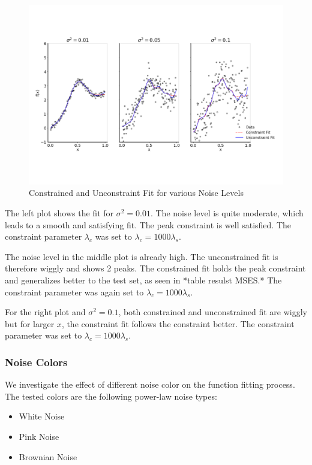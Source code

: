 \documentclass[10pt,a4paper]{article}
\begin{document}
\begin{figure}[H]
	\centering
	\includegraphics[width=\columnwidth]{../thesisplots/exp_noise_levels.pdf}
	\caption{Constrained and Unconstraint Fit for various Noise Levels}
	\label{fig:fit_noise_levels}
\end{figure}

The left plot shows the fit for $\sigma^2 = 0.01$. The noise level is quite moderate, which leads to a smooth and satisfying fit. The peak constraint is well satisfied. The constraint parameter $\lambda_c$ was set to $\lambda_c = 1000\lambda_s$. 

The noise level in the middle plot is already high. The unconstrained fit is therefore wiggly and shows 2 peaks. The constrained fit holds the peak constraint and generalizes better to the test set, as seen in *table resulst MSES.* The constraint parameter was again set to $\lambda_c = 1000\lambda_s.$ 

For the right plot and $\sigma^2=0.1$, both constrained and unconstrained fit are wiggly but for larger $x$, the constraint fit follows the constraint better. The constraint parameter was set to $\lambda_c = 1000\lambda_s$.

\subsubsection{Noise Colors}

We investigate the effect of different noise color on the function fitting process. The tested colors are the following power-law noise types:

\begin{itemize}
	\item  White Noise
	\item Pink Noise
	\item Brownian Noise
\end{itemize}
\end{document}

